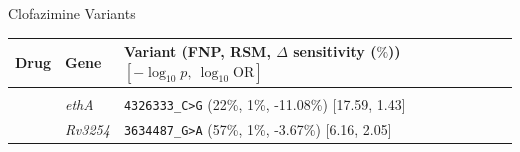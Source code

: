 \begin{frame}[allowframebreaks]{Clofazimine Variants}
\begingroup
\small
\setlength{\tabcolsep}{4pt}
\renewcommand{\arraystretch}{1.15}
\newlength{\colW}
\setlength{\colW}{\dimexpr\linewidth - 24pt\relax}
\newcommand{\tbsecrow}[1]{%
  \midrule[0.4pt]
  \multicolumn{3}{l}{\rule{0pt}{9pt}\textbf{\small #1}}\\[1pt]
}

\begin{tabular}{%
  >{\centering\arraybackslash}p{0.060\colW}%
  >{\raggedright\arraybackslash}p{0.120\colW}%
  >{\raggedright\arraybackslash}p{0.820\colW}%
}
\toprule
\textbf{Drug} & \textbf{Gene} & \textbf{Variant} (FNP, RSM, $\Delta$ sensitivity ($\%$)) $[-\log_{10}p,\ \log_{10}\mathrm{OR}]$\\
\midrule
\tbsecrow{Clofazimine}
& \textit{ethA}   & \texttt{4326333\_C>G} (22\%, 1\%, -11.08\%) [17.59, 1.43]\\
& \textit{Rv3254} & \texttt{3634487\_G>A} (57\%, 1\%, -3.67\%) [6.16, 2.05]\\
\bottomrule
\end{tabular}
\endgroup
\end{frame}
